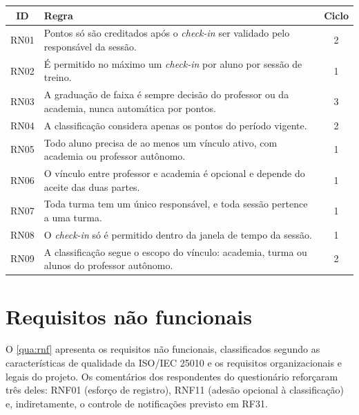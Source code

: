 \begin{quadro}[!htb]
  \caption{Regras de negócio}
  \label{qua:rn}
  \centering
  \footnotesize
  \begin{tabular}{|c|p{11.6cm}|c|}
    \hline
    \textbf{ID} & \textbf{Regra} & \textbf{Ciclo} \\ \hline
    RN01 & Pontos só são creditados após o \textit{check-in} ser validado pelo responsável da sessão. & 2 \\ \hline
    RN02 & É permitido no máximo um \textit{check-in} por aluno por sessão de treino. & 1 \\ \hline
    RN03 & A graduação de faixa é sempre decisão do professor ou da academia, nunca automática por pontos. & 3 \\ \hline
    RN04 & A classificação considera apenas os pontos do período vigente. & 2 \\ \hline
    RN05 & Todo aluno precisa de ao menos um vínculo ativo, com academia ou professor autônomo. & 1 \\ \hline
    RN06 & O vínculo entre professor e academia é opcional e depende do aceite das duas partes. & 1 \\ \hline
    RN07 & Toda turma tem um único responsável, e toda sessão pertence a uma turma. & 1 \\ \hline
    RN08 & O \textit{check-in} só é permitido dentro da janela de tempo da sessão. & 1 \\ \hline
    RN09 & A classificação segue o escopo do vínculo: academia, turma ou alunos do professor autônomo. & 2 \\ \hline
  \end{tabular}
\end{quadro}

\section{Requisitos não funcionais}
\label{sec:rnf}

O \autoref{qua:rnf} apresenta os requisitos não funcionais, classificados
segundo as características de qualidade da ISO/IEC 25010 e os requisitos
organizacionais e legais do projeto. Os comentários dos respondentes do
questionário reforçaram três deles: RNF01 (esforço de registro), RNF11
(adesão opcional à classificação) e, indiretamente, o controle de
notificações previsto em RF31.

